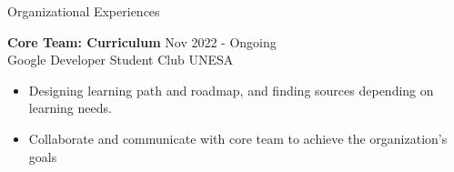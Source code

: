 \documentclass{resume} %
\begin{document}
\begin{rSection}{Organizational Experiences}

\textbf{Core Team: Curriculum} \hfill Nov 2022 - Ongoing\\
Google Developer Student Club UNESA 
 \begin{itemize}
    \itemsep -3pt {} 
     \item Designing learning path and roadmap, and finding sources depending on learning needs.
     \item Collaborate and communicate with core team to achieve the organization's goals
 \end{itemize}

\end{rSection}
\end{document}
